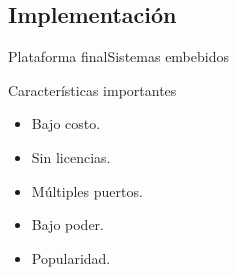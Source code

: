 \documentclass{beamer}
\begin{document}
    \subsection{Implementación}
    \begin{frame}{Plataforma final}{Sistemas embebidos}
        \begin{block}{Características importantes}{
            \begin{itemize}
                \item Bajo costo.
                \item Sin licencias.
                \item Múltiples puertos.
                \item Bajo poder.
                \item Popularidad.
            \end{itemize}
        }
        \end{block}
    \end{frame}


\end{document}
